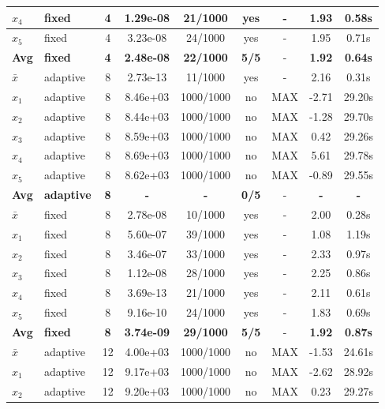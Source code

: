 \begin{longtable}{|l|l|c|c|c|c|c|c|c|}
\hline
$x_4$ & fixed & 4 & 1.29e-08 & 21/1000 & yes & - & 1.93 & 0.58s \\
\hline
$x_5$ & fixed & 4 & 3.23e-08 & 24/1000 & yes & - & 1.95 & 0.71s \\
\hline
\hline\hline
\textbf{Avg} & \textbf{fixed} & \textbf{4} & \textbf{2.48e-08} & \textbf{22/1000} & \textbf{5/5} & - & \textbf{1.92} & \textbf{0.64s} \\
\hline\hline
$\bar{x}$ & adaptive & 8 & 2.73e-13 & 11/1000 & yes & - & 2.16 & 0.31s \\
\hline
$x_1$ & adaptive & 8 & 8.46e+03 & 1000/1000 & no & MAX & -2.71 & 29.20s \\
\hline
$x_2$ & adaptive & 8 & 8.44e+03 & 1000/1000 & no & MAX & -1.28 & 29.70s \\
\hline
$x_3$ & adaptive & 8 & 8.59e+03 & 1000/1000 & no & MAX & 0.42 & 29.26s \\
\hline
$x_4$ & adaptive & 8 & 8.69e+03 & 1000/1000 & no & MAX & 5.61 & 29.78s \\
\hline
$x_5$ & adaptive & 8 & 8.62e+03 & 1000/1000 & no & MAX & -0.89 & 29.55s \\
\hline
\hline\hline
\textbf{Avg} & \textbf{adaptive} & \textbf{8} & \textbf{-} & \textbf{-} & \textbf{0/5} & - & \textbf{-} & \textbf{-} \\
\hline\hline
\hline
$\bar{x}$ & fixed & 8 & 2.78e-08 & 10/1000 & yes & - & 2.00 & 0.28s \\
\hline
$x_1$ & fixed & 8 & 5.60e-07 & 39/1000 & yes & - & 1.08 & 1.19s \\
\hline
$x_2$ & fixed & 8 & 3.46e-07 & 33/1000 & yes & - & 2.33 & 0.97s \\
\hline
$x_3$ & fixed & 8 & 1.12e-08 & 28/1000 & yes & - & 2.25 & 0.86s \\
\hline
$x_4$ & fixed & 8 & 3.69e-13 & 21/1000 & yes & - & 2.11 & 0.61s \\
\hline
$x_5$ & fixed & 8 & 9.16e-10 & 24/1000 & yes & - & 1.83 & 0.69s \\
\hline
\hline\hline
\textbf{Avg} & \textbf{fixed} & \textbf{8} & \textbf{3.74e-09} & \textbf{29/1000} & \textbf{5/5} & - & \textbf{1.92} & \textbf{0.87s} \\
\hline\hline
$\bar{x}$ & adaptive & 12 & 4.00e+03 & 1000/1000 & no & MAX & -1.53 & 24.61s \\
\hline
$x_1$ & adaptive & 12 & 9.17e+03 & 1000/1000 & no & MAX & -2.62 & 28.92s \\
\hline
$x_2$ & adaptive & 12 & 9.20e+03 & 1000/1000 & no & MAX & 0.23 & 29.27s \\

\end{longtable}

